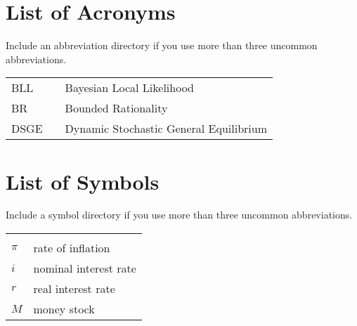 \documentclass[11pt,a4paper]{article}
\begin{document}
\newpage
\listoftables
\newpage

\section*{List of Acronyms} %
\rule[0pt]{0mm}{10pt}
\noindent Include an abbreviation directory if you use more than three uncommon abbreviations.\\

\begin{tabular}{l l l}


	BLL && Bayesian Local Likelihood\\
	BR&&Bounded Rationality\\
	DSGE&&Dynamic Stochastic General Equilibrium\\


\end{tabular}

\newpage

\section*{List of Symbols} 
\noindent Include a symbol directory if you use more than three uncommon abbreviations.
	\begin{tabular}{l l}
		\textbf{} & \\
		$\pi$ & rate of inflation\\
		$i$ & nominal interest rate \\
		$r$ & real interest rate \\
		$M$ & money stock \\


	\end{tabular}\\ \vspace{1cm}

								
		
		


\newpage


\pagestyle{fancy}						
\fancyhf{}								
\fancyhead[R]{}							 
\renewcommand{\headrulewidth}{0pt}	 
\fancyfoot[R]{\thepage}				 
\renewcommand{\footrulewidth}{0pt}	 
\onehalfspacing	
\end{document}
